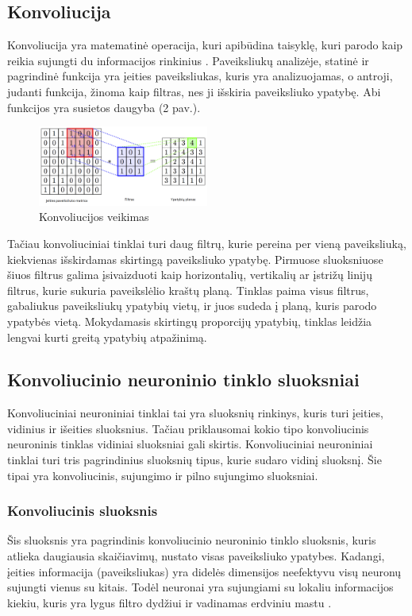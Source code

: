 \documentclass{VUMIFPSkursinis}
\begin{document}
\subsection{Konvoliucija}
Konvoliucija yra matematinė operacija, kuri apibūdina taisyklę, kuri parodo kaip reikia sujungti du informacijos rinkinius \cite{Convolution-book}. 
Paveiksliukų analizėje, statinė ir pagrindinė funkcija yra įeities paveiksliukas, kuris yra analizuojamas, o antroji, judanti funkcija, žinoma 
kaip filtras, nes ji išskiria paveiksliuko ypatybę. Abi funkcijos yra susietos daugyba (2 pav.). 

\begin{figure}[h]
\centering
\includegraphics[width=0.5\textwidth]{img/Konvoliucija.png}
\caption{Konvoliucijos veikimas}
\end{figure}

Tačiau konvoliuciniai tinklai turi daug filtrų, kurie pereina per vieną paveiksliuką, kiekvienas išskirdamas skirtingą paveiksliuko ypatybę.
Pirmuose sluoksniuose šiuos filtrus galima įsivaizduoti kaip horizontalių, vertikalių ar įstrižų linijų filtrus, kurie sukuria paveikslėlio 
kraštų planą. Tinklas paima visus filtrus, gabaliukus paveiksliukų ypatybių vietų, ir juos sudeda į planą, kuris parodo ypatybės vietą. 
Mokydamasis skirtingų proporcijų ypatybių, tinklas leidžia lengvai kurti greitą ypatybių atpažinimą.

\subsection{Konvoliucinio neuroninio tinklo sluoksniai}
Konvoliuciniai neuroniniai tinklai tai yra sluoksnių rinkinys, kuris turi įeities, vidinius ir išeities sluoksnius. Tačiau priklausomai 
kokio tipo konvoliucinis neuroninis tinklas vidiniai sluoksniai gali skirtis. Konvoliuciniai neuroniniai tinklai turi tris pagrindinius 
sluoksnių tipus, kurie sudaro vidinį sluoksnį. Šie tipai yra konvoliucinis, sujungimo ir pilno sujungimo sluoksniai.

\subsubsection{Konvoliucinis sluoksnis}
Šis sluoksnis yra pagrindinis konvoliucinio neuroninio tinklo sluoksnis, kuris atlieka daugiausia skaičiavimų, nustato visas paveiksliuko ypatybes.
Kadangi, įeities informacija (paveiksliukas) yra didelės dimensijos neefektyvu visų neuronų sujungti vienus su kitais. Todėl neuronai yra sujungiami
su lokaliu informacijos kiekiu, kuris yra lygus filtro dydžiui ir vadinamas erdviniu mastu \cite{layers-CS231n}.
\end{document}
